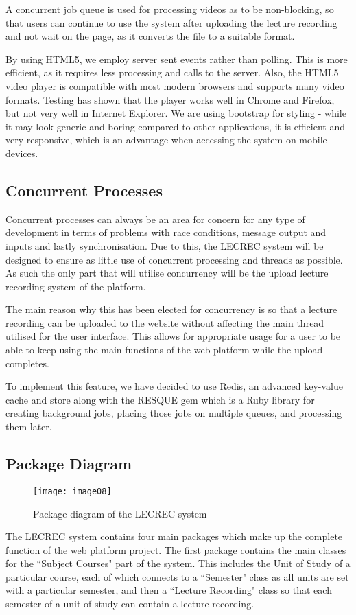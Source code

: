 \documentclass{article}
\begin{document}
A concurrent job queue is used for processing videos as to be non-blocking, so that users can continue to use the system after uploading the lecture recording and not wait on the page, as it converts the file to a suitable format. 

By using HTML5, we employ server sent events rather than polling. This is more efficient, as it requires less processing and calls to the server. Also, the HTML5 video player is compatible with most modern browsers and supports many video formats. Testing has shown that the player works well in Chrome and Firefox, but not very well in Internet Explorer. We are using bootstrap for styling - while it may look generic and boring compared to other applications, it is efficient and very responsive, which is an advantage when accessing the system on mobile devices.

\subsection{Concurrent Processes}
Concurrent processes can always be an area for concern for any type of development in terms of problems with race conditions, message output and inputs and lastly synchronisation. Due to this, the LECREC system will be designed to ensure as little use of concurrent processing and threads as possible. As such the only part that will utilise concurrency will be the upload lecture recording system of the platform. 

The main reason why this has been elected for concurrency is so that a lecture recording can be uploaded to the website without affecting the main thread utilised for the user interface. This allows for appropriate usage for a user to be able to keep using the main functions of the web platform while the upload completes.

To implement this feature, we have decided to use Redis, an advanced key-value cache and store along with the RESQUE gem which is a Ruby library for creating background jobs, placing those jobs on multiple queues, and processing them later.

\subsection{Package Diagram}
\begin{figure}[h!]
\centering
\texttt{[image: image08]}
\caption{Package diagram of the LECREC system}
\end{figure}
The LECREC system contains four main packages which make up the complete function of the web platform project. The first package contains the main classes for the ``Subject Courses" part of the system. This includes the Unit of Study of a particular course, each of which connects to a ``Semester" class as all units are set with a particular semester, and then a ``Lecture Recording" class so that each semester of a unit of study can contain a lecture recording.
\end{document}
